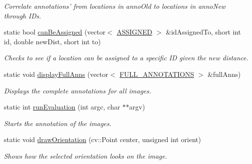 \begin{DoxyCompactItemize}
\begin{DoxyCompactList}\small\item\em Correlate annotations' from locations in {\ttfamily annoOld} to locations in {\ttfamily annoNew} through IDs. \item\end{DoxyCompactList}\item 
\hypertarget{classannotationsHandle_a82a7f09d712d49ea099b3e9c9ffc04c5}{
static bool \hyperlink{classannotationsHandle_a82a7f09d712d49ea099b3e9c9ffc04c5}{canBeAssigned} (vector$<$ \hyperlink{structannotationsHandle_1_1ASSIGNED}{ASSIGNED} $>$ \&idAssignedTo, short int id, double newDist, short int to)}
\label{classannotationsHandle_a82a7f09d712d49ea099b3e9c9ffc04c5}

\begin{DoxyCompactList}\small\item\em Checks to see if a location can be assigned to a specific ID given the new distance. \item\end{DoxyCompactList}\item 
\hypertarget{classannotationsHandle_a86d06efe7aa6e013a5739a625bed6726}{
static void \hyperlink{classannotationsHandle_a86d06efe7aa6e013a5739a625bed6726}{displayFullAnns} (vector$<$ \hyperlink{structannotationsHandle_1_1FULL__ANNOTATIONS}{FULL\_\-ANNOTATIONS} $>$ \&fullAnns)}
\label{classannotationsHandle_a86d06efe7aa6e013a5739a625bed6726}

\begin{DoxyCompactList}\small\item\em Displays the complete annotations for all images. \item\end{DoxyCompactList}\item 
static int \hyperlink{classannotationsHandle_ac3568b677d066530fd771952492293c3}{runEvaluation} (int argc, char $\ast$$\ast$argv)
\begin{DoxyCompactList}\small\item\em Starts the annotation of the images. \item\end{DoxyCompactList}\item 
\hypertarget{classannotationsHandle_a6d11e0a0dbc45897a8176d5970af5438}{
static void \hyperlink{classannotationsHandle_a6d11e0a0dbc45897a8176d5970af5438}{drawOrientation} (cv::Point center, unsigned int orient)}
\label{classannotationsHandle_a6d11e0a0dbc45897a8176d5970af5438}

\begin{DoxyCompactList}\small\item\em Shows how the selected orientation looks on the image. \item\end{DoxyCompactList}\end{DoxyCompactItemize}
